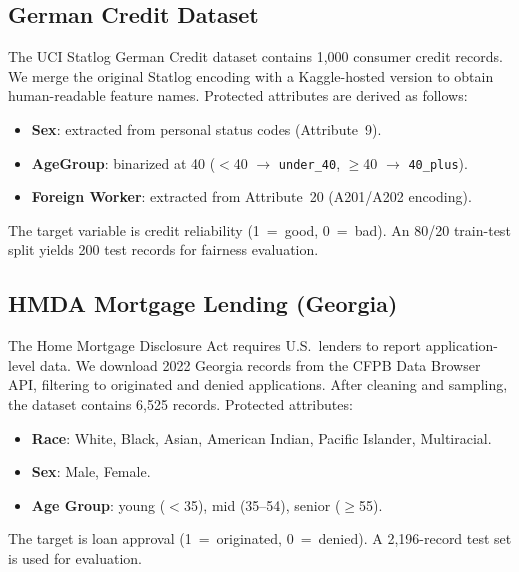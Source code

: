 \documentclass[11pt,a4paper]{article}
\begin{document}
\subsection{German Credit Dataset}

The UCI Statlog German Credit dataset contains 1{,}000 consumer credit
records. We merge the original Statlog encoding with a Kaggle-hosted
version to obtain human-readable feature names. Protected attributes are
derived as follows:
\begin{itemize}[nosep]
  \item \textbf{Sex}: extracted from personal status codes (Attribute~9).
  \item \textbf{AgeGroup}: binarized at 40 ($<$40 $\rightarrow$ \texttt{under\_40}, $\geq$40 $\rightarrow$ \texttt{40\_plus}).
  \item \textbf{Foreign Worker}: extracted from Attribute~20 (A201/A202 encoding).
\end{itemize}
The target variable is credit reliability (1~=~good, 0~=~bad). An 80/20
train-test split yields 200 test records for fairness evaluation.

\subsection{HMDA Mortgage Lending (Georgia)}

The Home Mortgage Disclosure Act requires U.S.\ lenders to report
application-level data. We download 2022 Georgia records from the
CFPB Data Browser API, filtering to originated and denied applications.
After cleaning and sampling, the dataset contains 6{,}525 records.
Protected attributes:
\begin{itemize}[nosep]
  \item \textbf{Race}: White, Black, Asian, American Indian, Pacific Islander, Multiracial.
  \item \textbf{Sex}: Male, Female.
  \item \textbf{Age Group}: young ($<$35), mid (35--54), senior ($\geq$55).
\end{itemize}
The target is loan approval (1~=~originated, 0~=~denied). A 2{,}196-record
test set is used for evaluation.

\begin{table}[H]
\centering
\caption{Dataset summary.}
\label{tab:datasets}
\end{table}
\end{document}
